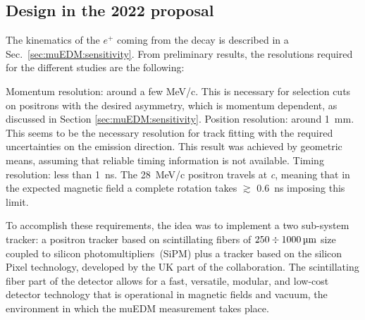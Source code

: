 \begin{refsection}
\section{Design in the 2022 proposal}
    The kinematics of the $e^+$ coming from the decay is described in a Sec.~\ref{sec:muEDM:sensitivity}.
    From preliminary results, the resolutions required for the different studies are the following:
    \begin{outline}
        \1 Momentum resolution: around a few MeV/c. 
        This is necessary for selection cuts on positrons with the desired asymmetry, which is momentum dependent, as discussed in Section \ref{sec:muEDM:sensitivity}.
        \1 Position resolution: around \SI{1}{mm}. This seems to be the necessary resolution for track fitting with the required uncertainties on the emission direction. 
        This result was achieved by geometric means, assuming that reliable timing information is not available. 
        \1 Timing resolution: less than \SI{1}{ns}. The \SI{28}{MeV/c} positron travels at \textit{c}, meaning that in the expected magnetic field a complete rotation takes $\gtrsim$ \SI{0.6}{ns} imposing this limit. 
    \end{outline}
    \noindent
    To accomplish these requirements, the idea was to implement a two sub-system tracker: a positron tracker based on scintillating fibers of $250\divisionsymbol\SI{1000}{\micro\meter}$ size coupled to silicon photomultipliers~(SiPM) plus a tracker based on the silicon Pixel technology, developed by the UK part of the collaboration.  
    The scintillating fiber part of the detector allows for a fast, versatile, modular, and low-cost detector technology that is operational in magnetic fields and vacuum, the environment in which the muEDM measurement takes place.
    

\end{refsection}

